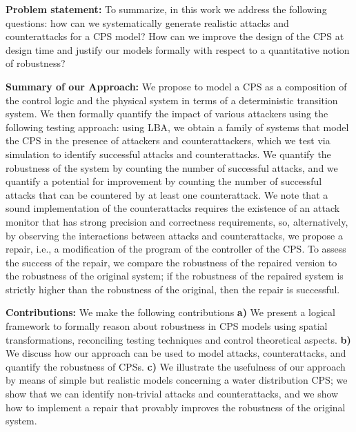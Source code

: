 \textbf{Problem statement:} To summarize, in this work we address the following
questions: how can we systematically generate realistic attacks and counterattacks for a CPS model? %
How can we improve the design of the CPS at design time and justify our models formally with respect to a quantitative notion of robustness?

\textbf{Summary of our Approach:} We propose to model a CPS as a composition of the control logic and the physical system in terms of a deterministic transition system. We then formally quantify the impact of various attackers using the following testing approach: using LBA, we obtain a family of systems that model the CPS in the presence of attackers and counterattackers, which we test via simulation to identify successful attacks and counterattacks. We quantify the robustness of the system by counting the number of successful attacks, and we quantify a potential for improvement by counting the number of successful attacks that can be countered by at least one counterattack. We note that a sound implementation of the counterattacks requires the existence of an attack monitor that has strong precision and correctness requirements, so, alternatively, by observing the interactions between attacks and counterattacks, we propose a repair, i.e., a modification of the program of the controller of the CPS. To assess the success of the repair, we compare the robustness of the repaired version to the robustness of the original system; if the robustness of the repaired system is strictly higher than the robustness of the original, then the repair is successful. 

\textbf{Contributions:} We make the following contributions \textbf{a)} We present a logical framework to formally reason about robustness in CPS models using spatial transformations, 
reconciling testing techniques and control theoretical aspects. \textbf{b)} We discuss how our approach can be used to model attacks, counterattacks, and quantify the robustness of CPSs. \textbf{c)} We illustrate the usefulness of
our approach by means of simple but realistic models concerning a water
distribution CPS; we show that we can identify non-trivial attacks and counterattacks, and we show how to implement a repair that provably improves the robustness of the original system.

